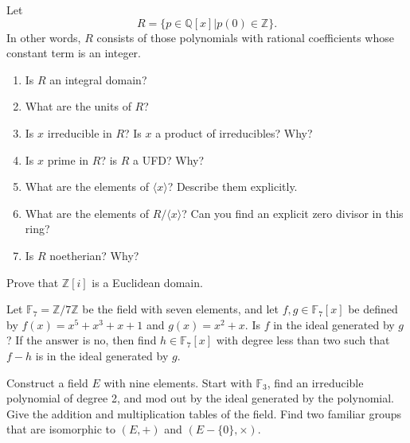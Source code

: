 \documentclass[12pt,letterpaper,boxed]{hmcpset}
\begin{document}

\begin{problem}[18.3.13]
Let $$ R = \{ p \in \mathbb{Q}[x] \vert p(0) \in  \mathbb{Z} \}. $$
In other words, $R$ consists of those polynomials with rational coefficients whose constant term is an integer. 
\begin{enumerate}[label=\alph*]
\item Is $R$ an integral domain?
\item What are the units of $R$?
\item Is $x$ irreducible in $R$? Is $x$ a product of irreducibles? Why?
\item Is $x$ prime in $R$? is $R$ a UFD? Why?
\item What are the elements of $\langle x \rangle$? Describe them explicitly. 
\item What are the elements of $R/\langle x \rangle$? Can you find an explicit zero divisor in this ring?
\item Is $R$ noetherian? Why?
\end{enumerate}
\end{problem}

\begin{solution}
\end{solution}

\clearpage

\begin{problem}[18.4.7]
Prove that $\mathbb{Z}[i]$ is a Euclidean domain. 
\end{problem}

\begin{solution}
\end{solution}

\clearpage

\begin{problem}[19.2.8]
Let $\mathbb{F}_7 = \mathbb{Z}/7\mathbb{Z}$ be the field with seven elements, and let $f,g \in \mathbb{F}_7[x]$ be defined by $f(x) = x^5 + x^3 + x + 1$ and $g(x) = x^2 + x$. Is $f$ in the ideal generated by $g$? If the answer is no, then find $h \in \mathbb{F}_7[x]$ with degree less than two such that $f-h$ is in the ideal generated by $g$.
\end{problem}

\begin{solution}
\end{solution}

\clearpage

\begin{problem}[19.3.4]
Construct a field $E$ with nine elements. Start with $\mathbb{F}_3$, find an irreducible polynomial of degree 2, and mod out by the ideal generated by the polynomial. Give the addition and multiplication tables of the field. Find two familiar groups that are isomorphic to $(E,+)$ and $(E-\{0\},\times)$.
\end{problem}
\end{document}
